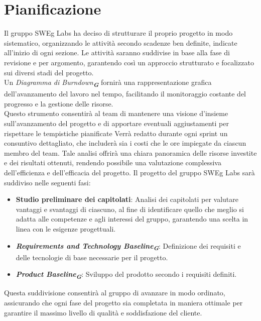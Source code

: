 
\section{Pianificazione}
\label{sec:pianificazione}
Il gruppo SWEg Labs ha deciso di strutturare il proprio progetto in modo sistematico, 
organizzando le attività secondo scadenze ben definite, indicate all'inizio di ogni sezione. Le attività saranno suddivise in base alla fase di revisione e per argomento, garantendo così un approccio strutturato e focalizzato sui diversi stadi del progetto.\\
Un \emph{Diagramma di Burndown}\textsubscript{\textit{\textbf{G}}} fornirà una rappresentazione grafica dell'avanzamento del lavoro nel tempo, facilitando il monitoraggio costante del progresso e la gestione delle risorse.\\
Questo strumento consentirà al team di mantenere una visione d'insieme sull’avanzamento del progetto e di apportare eventuali aggiustamenti per rispettare le tempistiche pianificate
Verrà redatto durante ogni sprint un consuntivo dettagliato, che includerà sia i costi che le ore impiegate da ciascun membro del team. Tale analisi offrirà una chiara panoramica delle risorse investite e dei risultati ottenuti, rendendo possibile una valutazione complessiva dell’efficienza e dell’efficacia del progetto.
Il progetto del gruppo SWEg Labs sarà suddiviso nelle seguenti fasi:
\begin{itemize}
    \item \textbf{Studio preliminare dei capitolati}: Analisi dei capitolati per valutare vantaggi e svantaggi di ciascuno, al fine di identificare quello che meglio si adatta alle competenze e agli interessi del gruppo, garantendo una scelta in linea con le esigenze progettuali.
    \item \textbf{\emph{Requirements and Technology Baseline}}\textsubscript{\textit{\textbf{G}}}: Definizione dei requisiti e delle tecnologie di base necessarie per il progetto.
    \item \textbf{\emph{Product Baseline}}\textsubscript{\textit{\textbf{G}}}: Sviluppo del prodotto secondo i requisiti definiti.
\end{itemize}

Questa suddivisione consentirà al gruppo di avanzare in modo ordinato, 
assicurando che ogni fase del progetto sia completata in maniera ottimale per garantire il massimo livello di qualità e soddisfazione del cliente.

